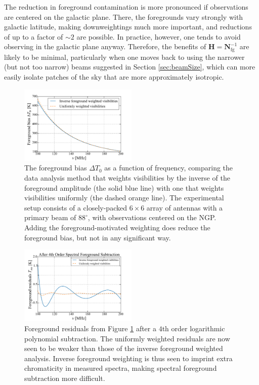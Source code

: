 \documentclass[twocolumn,apj,numberedappendix]{emulateapj}
\newcommand{\Hmat}{\mathbf{H}}
\newcommand{\Nfg}{\mathbf{N}_{\textrm{fg}}}
\newcommand{\acl}[1]{}
\begin{document}
The reduction in foreground contamination is more pronounced if observations are centered on the galactic plane. There, the foregrounds vary strongly with galactic latitude, making downweightings much more important, and reductions of up to a factor of $\sim 2$ are possible. In practice, however, one tends to avoid observing in the galactic plane anyway. Therefore, the benefits of $\Hmat = \Nfg^{-1}$ are likely to be minimal, particularly when one moves back to using the narrower (but not too narrow) beams suggested in Section \ref{sec:beamSize}, which can more easily isolate patches of the sky that are more approximately isotropic.

\begin{figure}[h]
	\centering
	\includegraphics[width=0.50\textwidth] {figures/NcomparisonNoSub.pdf}
	\caption{\acl{Updated figure and caption} The foreground bias $\Delta T_0$ as a function of frequency, comparing the data analysis method that weights visibilities by the inverse of the foreground amplitude (the solid blue line) with one that weights visibilities uniformly (the dashed orange line). The experimental setup consists of a closely-packed $6\times 6$ array of antennas with a primary beam of $88^\circ$, with observations centered on the NGP. Adding the foreground-motivated weighting does reduce the foreground bias, but not in any significant way.}
	\label{fig:Ncomparison}
\end{figure}

\begin{figure}[h]
	\centering
	\includegraphics[width=0.50\textwidth] {figures/NcomparisonPoly4.pdf}
	\caption{\acl{Updated figure and caption} Foreground residuals from Figure \ref{fig:Ncomparison} after a $4$th order logarithmic polynomial subtraction. The uniformly weighted residuals are now seen to be weaker than those of the inverse foreground weighted analysis. Inverse foreground weighting is thus seen to imprint extra chromaticity in measured spectra, making spectral foreground subtraction more difficult.}
	\label{fig:NcomparisonPoly4}
\end{figure}
\end{document}
